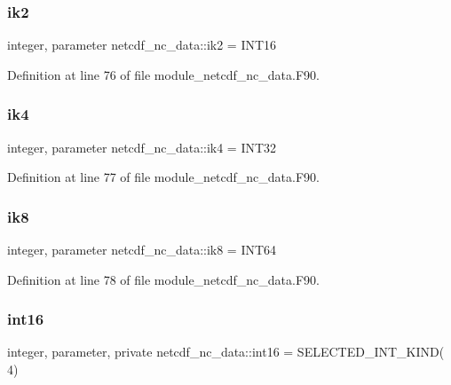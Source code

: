 \subsubsection{\texorpdfstring{ik2}{ik2}}
{\footnotesize\ttfamily integer, parameter netcdf\+\_\+nc\+\_\+data\+::ik2 = I\+N\+T16}



Definition at line 76 of file module\+\_\+netcdf\+\_\+nc\+\_\+data.\+F90.

\mbox{\label{namespacenetcdf__nc__data_a4704b689ce13181f04478d859655b674}} 
\subsubsection{\texorpdfstring{ik4}{ik4}}
{\footnotesize\ttfamily integer, parameter netcdf\+\_\+nc\+\_\+data\+::ik4 = I\+N\+T32}



Definition at line 77 of file module\+\_\+netcdf\+\_\+nc\+\_\+data.\+F90.

\mbox{\label{namespacenetcdf__nc__data_aa1206c3233d0d4a8e710ae6735c91e04}} 
\subsubsection{\texorpdfstring{ik8}{ik8}}
{\footnotesize\ttfamily integer, parameter netcdf\+\_\+nc\+\_\+data\+::ik8 = I\+N\+T64}



Definition at line 78 of file module\+\_\+netcdf\+\_\+nc\+\_\+data.\+F90.

\mbox{\label{namespacenetcdf__nc__data_afb8a8087476621863a989d4767e0098b}} 
\subsubsection{\texorpdfstring{int16}{int16}}
{\footnotesize\ttfamily integer, parameter, private netcdf\+\_\+nc\+\_\+data\+::int16 = S\+E\+L\+E\+C\+T\+E\+D\+\_\+\+I\+N\+T\+\_\+\+K\+I\+ND( 4)\hspace{0.3cm}{\ttfamily [private]}}




